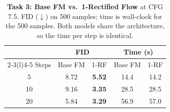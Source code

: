 \begin{table}[t]
  \centering
  \footnotesize
  \setlength{\tabcolsep}{4pt}
  \caption{\textbf{Task 3: Base FM vs.\ 1-Rectified Flow} at CFG 7.5. FID ($\downarrow$) on 500 samples; time is wall-clock for the 500 samples. Both models share the architecture, so the time per step is identical.}
  \label{tab:task3}
  \begin{tabular}{@{}ccccc@{}}
    \toprule
    & \multicolumn{2}{c}{FID} & \multicolumn{2}{c}{Time (s)} \\
    \cmidrule(lr){2-3}\cmidrule(l){4-5}
    Steps & Base FM & 1-RF & Base FM & 1-RF \\
    \midrule
    5  & 8.72 & \textbf{5.52} & 14.4 & 14.2 \\
    10 & 9.16 & \textbf{3.35} & 28.5 & 28.5 \\
    20 & 5.84 & \textbf{3.29} & 56.9 & 57.0 \\
    \bottomrule
  \end{tabular}
\end{table}
